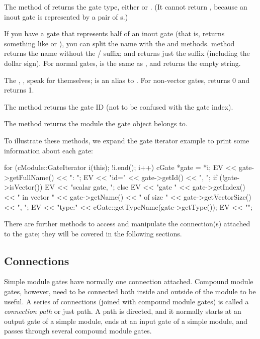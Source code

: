 \begin{ned}
The  method of  returns the gate type,
either  or . (It cannot return
, because an inout gate is represented by a pair
of s.)

If you have a gate that represents half of an inout gate (that is,
 returns something like  or ), you
can split the name with the  and
 methods.  method returns the
name without the / suffix; and 
returns just the suffix (including the dollar sign). For normal gates,
 is the same as , and
 returns the empty string.

The , ,  speak
for themselves;  is an alias to . For
non-vector gates,  returns 0 and 
returns 1.

The  method returns the gate ID (not to be confused
with the gate index).

The  method returns the module the gate object
belongs to.

To illustrate these methods, we expand the gate iterator example
to print some information about each gate:

\begin{cpp}
for (cModule::GateIterator i(this); !i.end(); i++) {
    cGate *gate = *i;
    EV << gate->getFullName() << ": ";
    EV << "id=" << gate->getId() << ", ";
    if (!gate->isVector())
        EV << "scalar gate, ";
    else
        EV << "gate " << gate->getIndex()
           << " in vector " << gate->getName()
           << " of size " << gate->getVectorSize() << ", ";
    EV << "type:" << cGate::getTypeName(gate->getType());
    EV << "\n";
}
\end{cpp}

There are further  methods to access and manipulate
the connection(s) attached to the gate; they will be covered in the
following sections.


\subsection{Connections}
\label{sec:simple-modules:connections}

Simple module gates have normally one connection attached. Compound module
gates, however, need to be connected both inside and outside of the
module to be useful. A series of connections (joined with compound
module gates) is called a \textit{connection path} or just path.
A path is directed, and it normally starts at an output gate of
a simple module, ends at an input gate of a simple module,
and passes through several compound module gates.


\end{ned}
